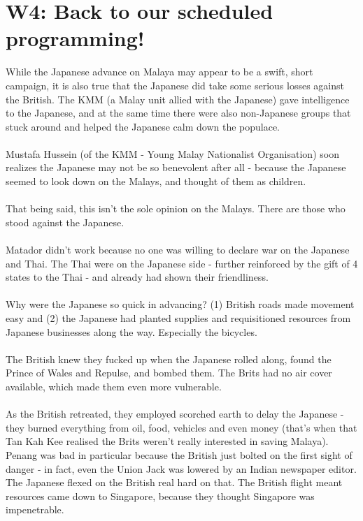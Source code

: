 \documentclass[a4paper]{article}
\begin{document}
\section{W4: Back to our scheduled programming!}
While the Japanese advance on Malaya may appear to be a swift, short campaign, it is also true that the Japanese did take some serious losses against the British. The KMM (a Malay unit allied with the Japanese) gave intelligence to the Japanese, and at the same time there were also non-Japanese groups that stuck around and helped the Japanese calm down the populace.\\
\\
Mustafa Hussein (of the KMM - Young Malay Nationalist Organisation) soon realizes the Japanese may not be so benevolent after all - because the Japanese seemed to look down on the Malays, and thought of them as children.\\
\\
That being said, this isn't the sole opinion on the Malays. There are those who stood against the Japanese.\\
\\
Matador didn't work because no one was willing to declare war on the Japanese and Thai. The Thai were on the Japanese side - further reinforced by the gift of 4 states to the Thai - and already had shown their friendliness.\\
\\
Why were the Japanese so quick in advancing? (1) British roads made movement easy and (2) the Japanese had planted supplies and requisitioned resources from Japanese businesses along the way. Especially the bicycles.\\
\\
The British knew they fucked up when the Japanese rolled along, found the Prince of Wales and Repulse, and bombed them. The Brits had no air cover available, which made them even more vulnerable.\\
\\
As the British retreated, they employed scorched earth to delay the Japanese - they burned everything from oil, food, vehicles and even money (that's when that Tan Kah Kee realised the Brits weren't really interested in saving Malaya). Penang was bad in particular because the British just bolted on the first sight of danger - in fact, even the Union Jack was lowered by an Indian newspaper editor. The Japanese flexed on the British real hard on that. The British flight meant resources came down to Singapore, because they thought Singapore was impenetrable.\\
\end{document}
